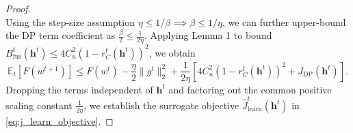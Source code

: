 \documentclass[5p,times]{elsarticle}
\theoremstyle{plain}
\theoremstyle{definition}
\theoremstyle{remark}
\begin{document}
\begin{proof}
\begin{equation}
\end{equation}
Using the step-size assumption $\eta \le 1/\beta \implies \beta \le 1/\eta$, we can further upper-bound the DP term coefficient as $\frac{\beta}{2} \le \frac{1}{2\eta}$. Applying Lemma 1 to bound $B_{\mathrm{fus}}^t(\mathbf h^t) \le 4C_u^2(1 - r_C^t(\mathbf h^t))^2$, we obtain
\begin{equation}
\mathbb E_t[F(w^{t+1})] \le F(w^t) - \frac{\eta}{2}\|g^t\|_2^2 + \frac{1}{2\eta}\left[ 4C_u^2(1 - r_C^t(\mathbf h^t))^2 + J_{\mathrm{DP}}(\mathbf h^t) \right].
\end{equation}
Dropping the terms independent of $\mathbf h^t$ and factoring out the common positive scaling constant $\frac{1}{2\eta}$, we establish the surrogate objective $\widehat J_{\mathrm{learn}}^t(\mathbf h^t)$ in \eqref{eq:j_learn_objective}.
\end{proof}



\end{document}

